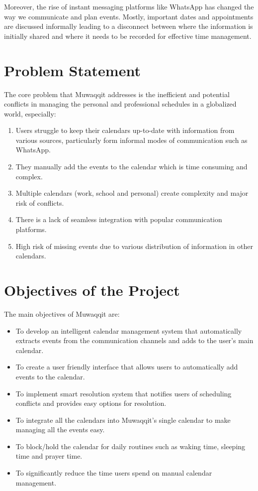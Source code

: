 \documentclass[12pt,a4paper]{article}
\begin{document}
Moreover, the rise of instant messaging platforms like WhatsApp has changed the way we communicate and plan events. Mostly, important dates and appointments are discussed informally leading to a disconnect between where the information is initially shared and where it needs to be recorded for effective time management. 

\section{Problem Statement}

The core problem that Muwaqqit addresses is the inefficient and potential conflicts in managing the personal and professional schedules in a globalized world, especially:

\begin{enumerate}
    \item Users struggle to keep their calendars up-to-date with information from various sources, particularly form informal modes of communication such as WhatsApp.
    \item They manually add the events to the calendar which is time consuming and complex.
    \item Multiple calendars (work, school and personal) create complexity and major risk of conflicts.
    \item There is a lack of seamless integration with popular communication platforms.
    \item High risk of missing events due to various distribution of information in other calendars.
\end{enumerate}

\section{Objectives of the Project}

The main objectives of Muwaqqit are:

\begin{itemize}
    \item To develop an intelligent calendar management system that automatically extracts events from the communication channels and adds to the user's main calendar.
    \item To create a user friendly interface that allows users to automatically add events to the calendar.
    \item To implement smart resolution system that notifies users of scheduling conflicts and provides easy options for resolution.
    \item To integrate all the calendars into Muwaqqit's single calendar to make managing all the events easy.
    \item To block/hold the calendar for daily routines such as waking time, sleeping time and prayer time.
    \item To significantly reduce the time users spend on manual calendar management.
\end{itemize}
\end{document}
